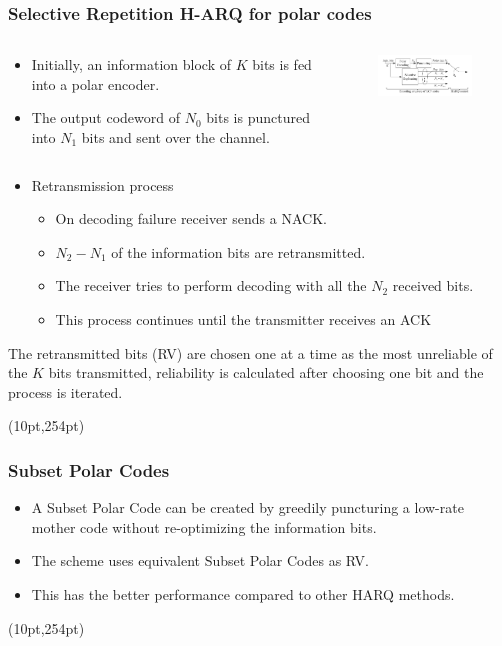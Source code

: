 \documentclass[xcolor=dvipsnames]{beamer}
\newcommand\hyperback[1]{%
  \begin{textblock*}{\paperwidth}(10pt,254pt)
    \raggedright #1\hspace{.5em}
  \end{textblock*}}
\begin{document}
\begin{frame}[label = selrep]
\frametitle{Selective Repetition H-ARQ for polar codes}
\begin{columns}
\begin{column}{0.4\textwidth}
\begin{itemize}
\item Initially, an information block of $K$ bits is fed into a polar encoder.
\item The output codeword of $N_0$ bits is punctured into $N_1$
bits and sent over the channel.
\end{itemize}
\end{column}
\begin{column}{0.5\textwidth}
\begin{figure}
\includegraphics[width=6cm]{./selrepharq.png}
\end{figure}
\end{column}
\end{columns}
\begin{itemize}
\item {Retransmission process}
\begin{itemize}
\item On decoding failure receiver sends a NACK.
\item $N_2-N_1$ of the information bits are retransmitted. 
\item The receiver tries to perform decoding with all the $N_2$ received
bits.
\item This process continues until the transmitter
receives an ACK 
\end{itemize}
\end{itemize}
\vspace{.5cm}
\tiny The retransmitted bits (RV) are chosen one at a time as the most unreliable of the $K$ bits transmitted, reliability is calculated after choosing one bit and the process is iterated.
\hyperback{\hyperlink{HARQp}{}}
\end{frame}
\begin{frame}[label = subpol]
\frametitle{Subset Polar Codes}
\begin{itemize}
\item A Subset Polar Code can be created by greedily puncturing a low-rate mother code without re-optimizing the information bits.
\item The scheme uses equivalent Subset Polar Codes as RV.
\item This has the better performance compared to other HARQ methods.
\end{itemize}
\hyperback{\hyperlink{HARQp}{}}
\end{frame}
\end{document}
